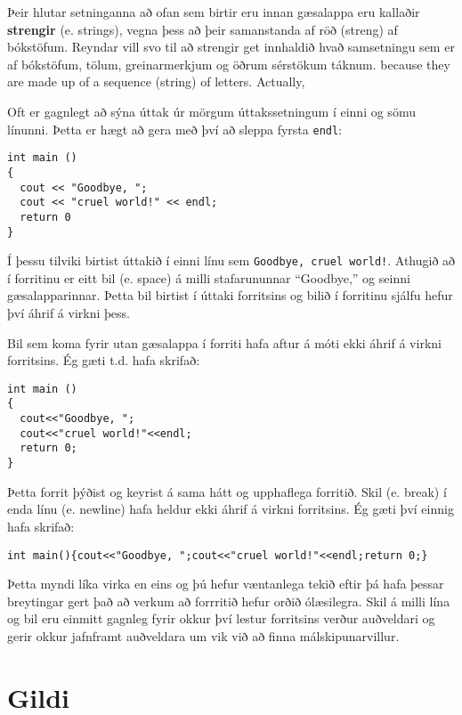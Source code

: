 
Þeir hlutar setninganna að ofan sem birtir eru innan gæsalappa eru kallaðir {\bf strengir} (e. strings),
vegna þess að þeir samanstanda af röð (streng) af bókstöfum.
Reyndar vill svo til að strengir get innhaldið hvað samsetningu sem er af bókstöfum, tölum, greinarmerkjum og öðrum sérstökum táknum.
because they are made up of a sequence (string) of letters.  Actually,


Oft er gagnlegt að sýna úttak úr mörgum úttakssetningum í einni og sömu línunni.
Þetta er hægt að gera með því að sleppa fyrsta {\tt endl}:

\begin{verbatim}
int main ()
{
  cout << "Goodbye, ";
  cout << "cruel world!" << endl;
  return 0
}
\end{verbatim}
%
Í þessu tilviki birtist úttakið í einni línu sem {\tt Goodbye, cruel world!}.
Athugið að í forritinu er eitt bil (e. space) á milli stafarununnar ``Goodbye,'' og seinni gæsalapparinnar.
Þetta bil birtist í úttaki forritsins og bilið í forritinu sjálfu hefur því áhrif á virkni þess.

Bil sem koma fyrir utan gæsalappa í forriti hafa aftur á móti ekki áhrif á virkni forritsins.
Ég gæti t.d. hafa skrifað:

\begin{verbatim}
int main ()
{
  cout<<"Goodbye, ";
  cout<<"cruel world!"<<endl;
  return 0;
}
\end{verbatim}
%
Þetta forrit þýðist og keyrist á sama hátt og upphaflega forritið.
Skil (e. break) í enda línu (e. newline) hafa heldur ekki áhrif á virkni forritsins.
Ég gæti því einnig hafa skrifað:

\begin{verbatim}
int main(){cout<<"Goodbye, ";cout<<"cruel world!"<<endl;return 0;}
\end{verbatim}
%
Þetta myndi líka virka en eins og þú hefur væntanlega tekið eftir þá hafa þessar breytingar gert það að verkum að forrritið hefur orðið ólæsilegra.
Skil á milli lína og bil eru einmitt gagnleg fyrir okkur því lestur forritsins verður auðveldari og gerir okkur jafnframt auðveldara um vik við að finna málskipunarvillur.

\section{Gildi}

